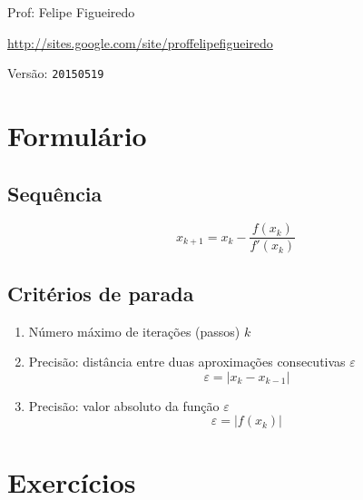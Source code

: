\documentclass[a4paper]{article}
\begin{document}
\parbox[c]{.825\textwidth}{\raggedright%
{Prof: Felipe Figueiredo\par}
{\url{http://sites.google.com/site/proffelipefigueiredo}\par}
}

Versão: \verb|20150519|



\section{Formulário}

\subsection*{Sequência}

\begin{displaymath}
  x_{k+1} = x_k - \frac{f(x_k)}{f'(x_k)}
\end{displaymath}

\subsection*{Critérios de parada}

\begin{enumerate}
\item Número máximo de iterações (passos) $k$

\item Precisão: distância entre duas aproximações consecutivas
  $\varepsilon$ 
  \begin{displaymath}
    \varepsilon = |x_k - x_{k-1}|
  \end{displaymath}

\item Precisão: valor absoluto da função $\varepsilon$
  \begin{displaymath}
    \varepsilon = |f(x_k)|
  \end{displaymath}

\end{enumerate}

\section{Exercícios}
\end{document}
